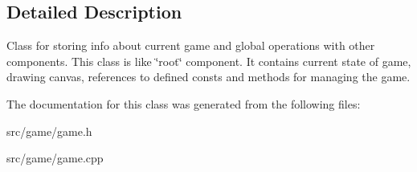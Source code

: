 \subsection{Detailed Description}
Class for storing info about current game and global operations with other components. This class is like \char`\"{}root\char`\"{} component. It contains current state of game, drawing canvas, references to defined consts and methods for managing the game. 

The documentation for this class was generated from the following files\+:\begin{DoxyCompactItemize}
\item 
src/game/game.\+h\item 
src/game/game.\+cpp\end{DoxyCompactItemize}
